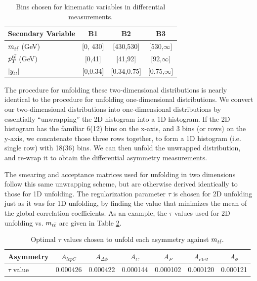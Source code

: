 \begin{table}[htb]
\begin{center}
\caption{Bins chosen for kinematic variables in differential measurements.}
\label{tab:afb:binning2d}
\begin{tabular}{l |  c  c  c }
\hline
Secondary Variable &  B1  &  B2 &  B3 \\ \hline
$m_{t\bar{t}}$ (GeV)    &  [0, 430]  &  [430,530]  &  [530,$\infty$]  \\ \hline
$p_{T}^{t\bar{t}}$ (GeV)    &  [0,41]  &  [41,92]  &  [92,$\infty$] \\ \hline
$|y_{t\bar{t}}|$        &  [0,0.34]  &  [0.34,0.75]  &  [0.75,$\infty$] \\ \hline
 \hline
\end{tabular}
\end{center}
\end{table}

The procedure for unfolding these two-dimensional distributions is
nearly identical to the procedure for unfolding
one-dimensional distributions. We convert our two-dimensional
distributions into one-dimensional distributions by essentially
``unwrapping'' the 2D histogram into a 1D histogram. If the 2D
histogram has the familiar 6(12) bins on the x-axis, and 3 bins (or rows) on the
y-axis, we concatenate those three rows together, to form a 1D histogram
(i.e. single row) with 18(36) bins. We can then unfold the unwrapped
distribution, and re-wrap it to obtain the differential asymmetry
measurements. %

The smearing and acceptance matrices used for unfolding in two
dimensions follow this same unwrapping scheme, but are otherwise
derived identically to those for 1D unfolding.
The regularization parameter $\tau$ is chosen for 2D unfolding just as
it was for 1D unfolding, by finding the value that minimizes the mean
of the global correlation coefficients. As an example, the $\tau$
values used for 2D unfolding vs. $m_{t\bar{t}}$ are given in Table
\ref{tab:afb:tau2d}.

\begin{table}[htpb]
\begin{center}
\caption{Optimal $\tau$ values chosen to unfold each asymmetry against
$m_{t\bar{t}}.$}
\label{tab:afb:tau2d}
\begin{tabular}{l | c  c  c  c  c  c }
\hline
Asymmetry & $A_{lepC}$ & $A_{\Delta\phi}$ & $A_{C}$ & $A_{P}$ & $A_{c1c2}$ & $A_{\phi}$ \\ \hline
$\tau$ value & 0.000426 & 0.000422 & 0.000144 & 0.000102 & 0.000120 & 0.000121 \\ \hline
\end{tabular}
\end{center}
\end{table}

